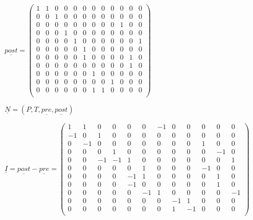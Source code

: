 \documentclass{scrreprt}
\begin{document}
\begin{enumerate}
\begin{enumerate}
\( \underline{post} = \begin{pmatrix}
1 & 1 & 0 & 0 & 0 & 0 & 0 & 0 & 0 & 0 & 0 & 0 \\ %
0 & 0 & 1 & 0 & 0 & 0 & 0 & 0 & 0 & 0 & 0 & 0 \\ %
0 & 0 & 0 & 0 & 0 & 0 & 0 & 0 & 0 & 1 & 0 & 0 \\ %
0 & 0 & 0 & 1 & 0 & 0 & 0 & 0 & 0 & 0 & 0 & 0 \\ %
0 & 0 & 0 & 0 & 1 & 0 & 0 & 0 & 0 & 0 & 0 & 1 \\ %
0 & 0 & 0 & 0 & 0 & 1 & 0 & 0 & 0 & 0 & 0 & 0 \\ %
0 & 0 & 0 & 0 & 0 & 1 & 0 & 0 & 0 & 0 & 1 & 0 \\ %
0 & 0 & 0 & 0 & 0 & 0 & 0 & 0 & 0 & 0 & 1 & 0 \\ %
0 & 0 & 0 & 0 & 0 & 0 & 1 & 0 & 0 & 0 & 0 & 0 \\ %
0 & 0 & 0 & 0 & 0 & 0 & 0 & 0 & 1 & 0 & 0 & 0 \\ %
0 & 0 & 0 & 0 & 0 & 0 & 1 & 1 & 0 & 0 & 0 & 0 \\ %
\end{pmatrix}\)

\( \underline{N} = (P, T, \underline{pre}, \underline{post})\)

\( \underline{I} = \underline{post} - \underline{pre} = \begin{pmatrix}
 1 & 1 & 0 & 0 & 0 & 0 &-1 & 0 & 0 & 0 & 0 & 0 \\ %
-1 & 0 & 1 & 0 & 0 & 0 & 0 & 0 & 0 & 0 & 0 & 0 \\ %
 0 &-1 & 0 & 0 & 0 & 0 & 0 & 0 & 0 & 1 & 0 & 0 \\ %
 0 & 0 & 0 & 1 & 0 & 0 & 0 & 0 & 0 & 0 &-1 & 0 \\ %
 0 & 0 &-1 &-1 & 1 & 0 & 0 & 0 & 0 & 0 & 0 & 1 \\ %
 0 & 0 & 0 & 0 & 0 & 1 & 0 & 0 & 0 &-1 & 0 & 0 \\ %
 0 & 0 & 0 & 0 &-1 & 1 & 0 & 0 & 0 & 0 & 1 & 0 \\ %
 0 & 0 & 0 & 0 &-1 & 0 & 0 & 0 & 0 & 0 & 1 & 0 \\ %
 0 & 0 & 0 & 0 & 0 &-1 & 1 & 0 & 0 & 0 & 0 &-1 \\ %
 0 & 0 & 0 & 0 & 0 & 0 & 0 &-1 & 1 & 0 & 0 & 0 \\ %
 0 & 0 & 0 & 0 & 0 & 0 & 0 & 1 &-1 & 0 & 0 & 0 \\ %
\end{pmatrix} \)


\end{enumerate}
\end{enumerate}
\end{document}
